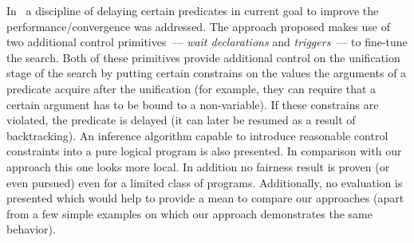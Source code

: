 In~\cite{Naish1985AutomatingCF} a discipline of delaying certain predicates in current goal to improve the performance/convergence was addressed. The approach proposed makes use of two
additional control primitives~--- \emph{wait declarations} and \emph{triggers}~--- to fine-tune the search. Both of these primitives provide additional control on the unification stage
of the search by putting certain constrains on the values the arguments of a predicate acquire after the unification (for example, they can require that a certain argument has to be
bound to a non-variable). If these constrains are violated, the predicate is delayed (it can later be resumed as a result of backtracking). An inference algorithm capable to introduce
reasonable control constraints into a pure logical program is also presented. In comparison with our approach this one looks more local. In addition no fairness result is proven
(or even pursued) even for a limited class of programs. Additionally, no evaluation is presented which would help to provide a mean to compare our approaches (apart from a few simple
examples on which our approach demonstrates the same behavior).
